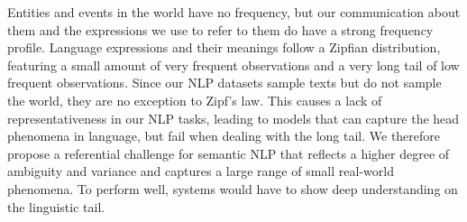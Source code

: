 Entities and events in the world have no frequency, but our communication about them and the expressions we use to refer to them do have a strong frequency profile. Language expressions and their meanings follow a Zipfian distribution, featuring a small amount of very frequent observations and a very long tail of low frequent observations. Since our NLP datasets sample texts but do not sample the world, they are no exception to Zipf's law. This causes a lack of representativeness in our NLP tasks, leading to models that can capture the head phenomena in language, but fail when dealing with the long tail. We therefore propose a referential challenge for semantic NLP that reflects a higher degree of ambiguity and variance and captures a large range of small real-world phenomena. To perform well, systems would have to show deep understanding on the linguistic tail.
